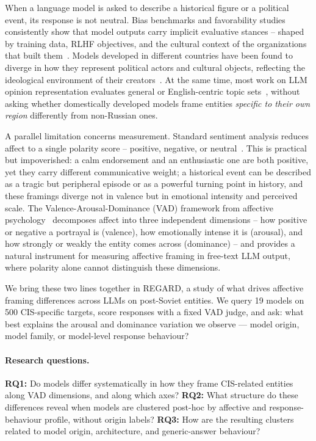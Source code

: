 \documentclass[runningheads,a4paper]{llncs}
\begin{document}
When a language model is asked to describe a historical figure or a
political event, its response is not neutral. Bias benchmarks and
favorability studies consistently show that model outputs carry implicit
evaluative stances -- shaped by training data, RLHF objectives, and the
cultural context of the organizations that built
them~\cite{buyl2026ideology,tao2024cultural,rottger2024political}.
Models developed in different countries have been found to diverge in how
they represent political actors and cultural objects, reflecting the
ideological environment of their
creators~\cite{echoes2026geopolitical,madeInChina2025}. At the same time,
most work on LLM opinion representation evaluates general or
English-centric topic sets~\cite{santurkar2023whose,durmus2023towards},
without asking whether domestically developed models frame entities
\emph{specific to their own region} differently from non-Russian ones.

A parallel limitation concerns measurement. Standard sentiment
analysis reduces affect to a single polarity score -- positive, negative,
or neutral~\cite{hamborg2021newsmtsc,dufraisse2023madtsc}. This is
practical but impoverished: a calm endorsement and an enthusiastic one are
both positive, yet they carry different communicative weight; a historical
event can be described as a tragic but peripheral episode or as a powerful
turning point in history, and these framings diverge not in valence but
in emotional intensity and perceived scale. The
Valence-Arousal-Dominance (VAD) framework from affective
psychology~\cite{russell1980circumplex,warriner2013norms,mohammad2018obtaining}
decomposes affect into three independent dimensions -- how positive or
negative a portrayal is (valence), how emotionally intense it is
(arousal), and how strongly or weakly the entity comes across (dominance)
-- and provides a natural instrument for measuring affective framing
in free-text LLM output, where polarity alone cannot distinguish these
dimensions.

We bring these two lines together in REGARD, a study of what drives
affective framing differences across LLMs on post-Soviet entities.
We query 19 models on 500 CIS-specific targets, score responses with
a fixed VAD judge, and ask: what best explains the arousal
and dominance variation we observe --- model origin, model family,
or model-level response behaviour?

\paragraph{Research questions.}
\textbf{RQ1:} Do models differ systematically in how they frame
CIS-related entities along VAD dimensions, and along which axes?
\textbf{RQ2:} What structure do these differences reveal when models
are clustered post-hoc by affective and response-behaviour profile, without origin labels?
\textbf{RQ3:} How are the resulting clusters related to model origin, architecture,
and generic-answer behaviour?
\end{document}
